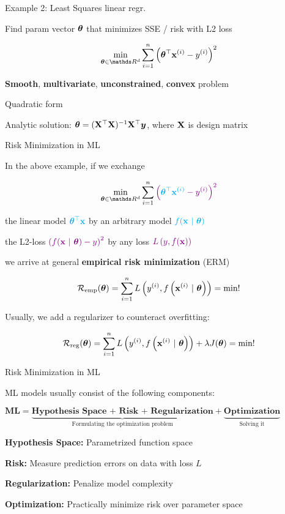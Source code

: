 \documentclass[11pt,compress,t,notes=noshow, xcolor=table]{beamer}
\begin{document}
\begin{framei}{Example 2: Least Squares linear regr.}
\item Find param vector $\bm{\theta}$ that minimizes SSE / risk with L2 loss
\item[] $$ \min_{\thetav \in \R^d} \sumin \left(\thetav^\top \xi - \yi\right)^2 $$
\vfill
\splitV
{
}
{
}
\item \textbf{Smooth}, \textbf{multivariate}, \textbf{unconstrained}, \textbf{convex} problem
\item Quadratic form
\item Analytic solution: $\bm{\theta} = (\mathbf{X}^\top \mathbf{X})^{-1}\mathbf{X}^\top \bm{y}$, where $\mathbf{X}$ is design matrix
\end{framei}

\begin{framei}{Risk Minimization in ML}
\item In the above example, if we exchange
\item[] $$ \min_{\thetav \in \R^d} \sum_{i = 1}^n \textcolor{violet}{\left(\textcolor{cyan}{\thetav^\top \xi} - \yi\right)^2} $$
\item the linear model $\textcolor{cyan}{\bm{\theta}^\top \mathbf{x}}$ by an arbitrary model $\textcolor{cyan}{f(\mathbf{x} ~|~ \bm{\theta})}$
\item the L2-loss $\textcolor{violet}{\left(f(\mathbf{x} ~|~ \bm{\theta}) - y\right)^2}$ by any loss $\textcolor{violet}{L\left(y, f(\mathbf{x})\right)}$
\item we arrive at general \textbf{empirical risk minimization} (ERM)
\item[] $$ \mathcal{R}_{\text{emp}}(\bm{\theta}) = \sum\limits_{i=1}^n L\left(y^{(i)}, f\left(\mathbf{x}^{(i)} ~|~ \bm{\theta}\right)\right) = \textrm{min}! $$
\item Usually, we add a regularizer to counteract overfitting:
\item[] $$ \mathcal{R}_{\text{reg}}(\bm{\theta}) =  \sum\limits_{i=1}^n L\left(y^{(i)}, f\left(\mathbf{x}^{(i)} ~|~ \bm{\theta}\right)\right) + \lambda J(\bm{\theta}) = \textrm{min}! $$
\end{framei}

\begin{framei}{Risk Minimization in ML}
\item ML models usually consist of the following components:
\item[] $\textbf{ML} = \underbrace{\textbf{Hypothesis Space + Risk + Regularization}}_{\text{Formulating the optimization problem}} + \underbrace{\textbf{Optimization}}_{\text{Solving it}}$
\item \textbf{Hypothesis Space:} Parametrized function space
\item \textbf{Risk:} Measure prediction errors on data with loss $L$
\item \textbf{Regularization:} Penalize model complexity
\item \textbf{Optimization:} Practically minimize risk over parameter space
\end{framei}
\end{document}
